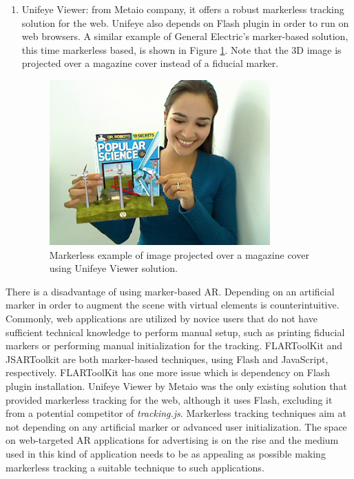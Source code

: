 \begin{enumerate}
    \item Unifeye Viewer: from Metaio company, it offers a robust markerless tracking solution for the web. Unifeye \cite{Metaio2009} also depends on Flash plugin in order to run on web browsers. A similar example of General Electric's marker-based solution, this time markerless based, is shown in Figure \ref{figure:unifeyeviewer}. Note that the 3D image is projected over a magazine cover instead of a fiducial marker.

    \begin{figure}[!htb]
      \centering
      \includegraphics[width=240pt]{chapters/tracking_library_for_the_web/unifeyeviewer.png}
      \caption{Markerless example of image projected over a magazine cover using Unifeye Viewer solution.}
      \label{figure:unifeyeviewer}
    \end{figure}
\end{enumerate}

There is a disadvantage of using marker-based AR. Depending on an artificial marker in order to augment the scene with virtual elements is counterintuitive. Commonly, web applications are utilized by novice users that do not have sufficient technical knowledge to perform manual setup, such as printing fiducial markers or performing manual initialization for the tracking. FLARToolKit and JSARToolkit are both marker-based techniques, using Flash and JavaScript, respectively. FLARToolKit has one more issue which is dependency on Flash plugin installation. Unifeye Viewer by Metaio was the only existing solution that provided markerless tracking for the web, although it uses Flash, excluding it from a potential competitor of \textit{tracking.js}. Markerless tracking techniques aim at not depending on any artificial marker or advanced user initialization. The space on web-targeted AR applications for advertising is on the rise and the medium used in this kind of application needs to be as appealing as possible \cite{Pablo2013} making markerless tracking a suitable technique to such applications.

